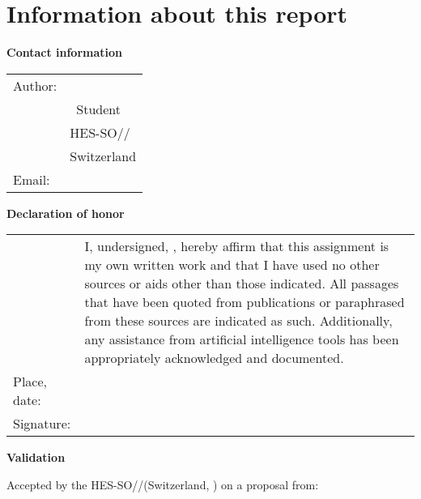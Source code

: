 {\sffamily%
\chapter*{Information about this report}

\vspace{\fill}

\textbf{Contact information}

\begin{tabularx}{\textwidth}{L{2.5cm}X}
	Author: & \AuthorFirstName ~\AuthorLastName \\
	        & \Diploma ~Student                 \\
	        & HES-SO//\Diploma                  \\
	        & Switzerland                       \\
	Email:  & \email{\AuthorEmail}
\end{tabularx}

\vspace{\fill}

\textbf{Declaration of honor}

{\renewcommand{\arraystretch}{2}
	\begin{tabularx}{\textwidth}{L{2.5cm}X}
		             & I, undersigned, \Author, hereby affirm that this assignment is my own written work and that I have used no other sources or aids other than those indicated. All passages that have been quoted from publications or paraphrased from these sources are indicated as such. Additionally, any assistance from artificial intelligence tools has been appropriately acknowledged and documented. \\
		Place, date: & \underline{\hspace{7cm}}                                                                                                                                                                                                                                                                                                                                                                       \\
		Signature:   & \underline{\hspace{7cm}}
	\end{tabularx}
}

\vspace{\fill}

\textbf{Validation}

Accepted by the HES-SO//\Diploma (Switzerland, \Place) on a proposal from:

}
